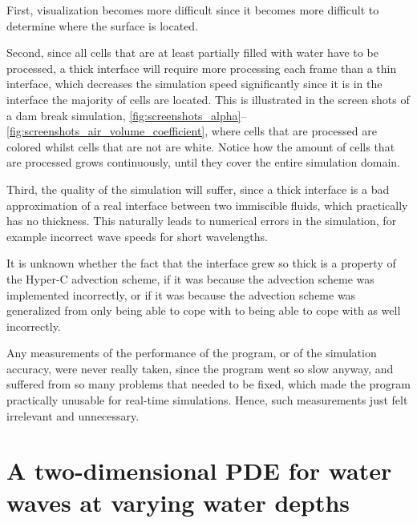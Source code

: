 \begin{itemize}
    First, visualization becomes more difficult since it becomes more difficult to determine where the surface is located.
    
    Second, since all cells that are at least partially filled with water have to be processed, a thick interface will require more processing each frame than a thin interface, which decreases the simulation speed significantly since it is in the interface the majority of cells are located. This is illustrated in the screen shots of a dam break simulation, \figrefs \ref{fig:screenshots_alpha}--\ref{fig:screenshots_air_volume_coefficient}, where cells that are processed are colored whilst cells that are not are white. Notice how the amount of cells that are processed grows continuously, until they cover the entire simulation domain.
    
    Third, the quality of the simulation will suffer, since a thick interface is a bad approximation of a real interface between two immiscible fluids, which practically has no thickness. This naturally leads to numerical errors in the simulation, for example incorrect wave speeds for short wavelengths.
    
    It is unknown whether the fact that the interface grew so thick is a property of the Hyper-C advection scheme, if it was because the advection scheme was implemented incorrectly, or if it was because the advection scheme was generalized from only being able to cope with  to being able to cope with  as well incorrectly.%
\end{itemize}

Any measurements of the performance of the program, or of the simulation accuracy, were never really taken, since the program went so slow anyway, and suffered from so many problems that needed to be fixed, which made the program practically unusable for real-time simulations. Hence, such measurements just felt irrelevant and unnecessary.

\section{A two-dimensional PDE for water waves at varying water depths}

